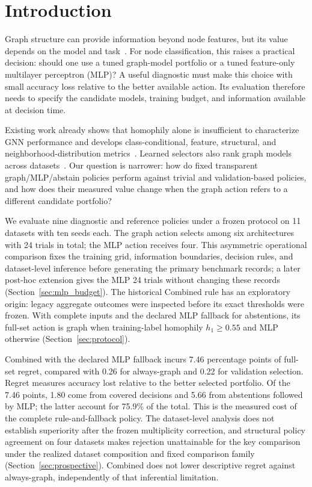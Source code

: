 \section{Introduction}

Graph structure can provide information beyond node features, but its value depends on the model and task~\citep{kipf2017gcn,velivckovic2018gat,hamilton2017graphsage}. For node classification, this raises a practical decision: should one use a tuned graph-model portfolio or a tuned feature-only multilayer perceptron (MLP)? A useful diagnostic must make this choice with small accuracy loss relative to the better available action. Its evaluation therefore needs to specify the candidate models, training budget, and information available at decision time.

Existing work already shows that homophily alone is insufficient to characterize GNN performance and develops class-conditional, feature, structural, and neighborhood-distribution metrics~\citep{luan2023whendo,platonov2023characterizing,zheng2024trihom,pmlr-v235-wang24u}. Learned selectors also rank graph models across datasets~\citep{park2023metagl,park2023glemos}. Our question is narrower: how do fixed transparent graph/MLP/abstain policies perform against trivial and validation-based policies, and how does their measured value change when the graph action refers to a different candidate portfolio?

We evaluate nine diagnostic and reference policies under a frozen protocol on 11 datasets with ten seeds each. The graph action selects among six architectures with 24 trials in total; the MLP action receives four. This asymmetric operational comparison fixes the training grid, information boundaries, decision rules, and dataset-level inference before generating the primary benchmark records; a later post-hoc extension gives the MLP 24 trials without changing these records (Section~\ref{sec:mlp_budget}). The historical Combined rule has an exploratory origin: legacy aggregate outcomes were inspected before its exact thresholds were frozen. With complete inputs and the declared MLP fallback for abstentions, its full-set action is graph when training-label homophily $h_1\geq0.55$ and MLP otherwise (Section~\ref{sec:protocol}).

Combined with the declared MLP fallback incurs 7.46 percentage points of full-set regret, compared with 0.26 for always-graph and 0.22 for validation selection. Regret measures accuracy lost relative to the better selected portfolio. Of the 7.46 points, 1.80 come from covered decisions and 5.66 from abstentions followed by MLP; the latter account for 75.9\% of the total. This is the measured cost of the complete rule-and-fallback policy. The dataset-level analysis does not establish superiority after the frozen multiplicity correction, and structural policy agreement on four datasets makes rejection unattainable for the key comparison under the realized dataset composition and fixed comparison family (Section~\ref{sec:prospective}). Combined does not lower descriptive regret against always-graph, independently of that inferential limitation.

